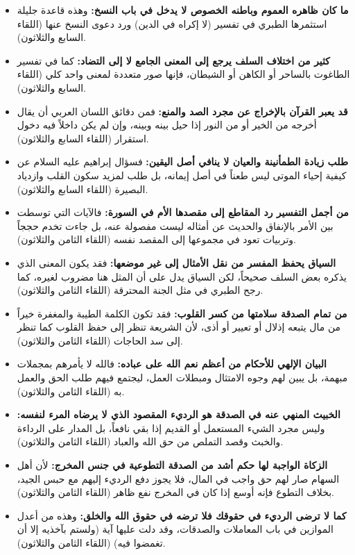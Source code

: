 \begin{itemize}
    \item \textbf{ما كان ظاهره العموم وباطنه الخصوص لا يدخل في باب النسخ:} وهذه قاعدة جليلة استثمرها الطبري في تفسير (لا إكراه في الدين) ورد دعوى النسخ عنها (اللقاء السابع والثلاثون).
    \item \textbf{كثير من اختلاف السلف يرجع إلى المعنى الجامع لا إلى التضاد:} كما في تفسير الطاغوت بالساحر أو الكاهن أو الشيطان، فإنها صور متعددة لمعنى واحد كلي (اللقاء السابع والثلاثون).
    \item \textbf{قد يعبر القرآن بالإخراج عن مجرد الصد والمنع:} فمن دقائق اللسان العربي أن يقال أخرجه من الخير أو من النور إذا حيل بينه وبينه، وإن لم يكن داخلاً فيه دخول استقرار (اللقاء السابع والثلاثون).
    \item \textbf{طلب زيادة الطمأنينة والعيان لا ينافي أصل اليقين:} فسؤال إبراهيم عليه السلام عن كيفية إحياء الموتى ليس طعناً في أصل إيمانه، بل طلب لمزيد سكون القلب وازدياد البصيرة (اللقاء السابع والثلاثون).
    \item \textbf{من أجمل التفسير رد المقاطع إلى مقصدها الأم في السورة:} فالآيات التي توسطت بين الأمر بالإنفاق والحديث عن أمثاله ليست مفصولة عنه، بل جاءت تخدم حججاً وتربيات تعود في مجموعها إلى المقصد نفسه (اللقاء الثامن والثلاثون).
    \item \textbf{السياق يحفظ المفسر من نقل الأمثال إلى غير موضعها:} فقد يكون المعنى الذي يذكره بعض السلف صحيحاً، لكن السياق يدل على أن المثل هنا مضروب لغيره، كما رجح الطبري في مثل الجنة المحترقة (اللقاء الثامن والثلاثون).
    \item \textbf{من تمام الصدقة سلامتها من كسر القلوب:} فقد تكون الكلمة الطيبة والمغفرة خيراً من مال يتبعه إذلال أو تعيير أو أذى، لأن الشريعة تنظر إلى حفظ القلوب كما تنظر إلى سد الحاجات (اللقاء الثامن والثلاثون).
    \item \textbf{البيان الإلهي للأحكام من أعظم نعم الله على عباده:} فالله لا يأمرهم بمجملات مبهمة، بل يبين لهم وجوه الامتثال ومبطلات العمل، ليجتمع فيهم طلب الحق والعمل به (اللقاء الثامن والثلاثون).
    \item \textbf{الخبيث المنهي عنه في الصدقة هو الرديء المقصود الذي لا يرضاه المرء لنفسه:} وليس مجرد الشيء المستعمل أو القديم إذا بقي نافعاً، بل المدار على الرداءة والخبث وقصد التملص من حق الله والعباد (اللقاء الثامن والثلاثون).
    \item \textbf{الزكاة الواجبة لها حكم أشد من الصدقة التطوعية في جنس المخرج:} لأن أهل السهام صار لهم حق واجب في المال، فلا يجوز دفع الرديء إليهم مع حبس الجيد، بخلاف التطوع فإنه أوسع إذا كان في المخرج نفع ظاهر (اللقاء الثامن والثلاثون).
    \item \textbf{كما لا ترضى الرديء في حقوقك فلا ترضه في حقوق الله والخلق:} وهذه من أعدل الموازين في باب المعاملات والصدقات، وقد دلت عليها آية (ولستم بآخذيه إلا أن تغمضوا فيه) (اللقاء الثامن والثلاثون).

\end{itemize}

